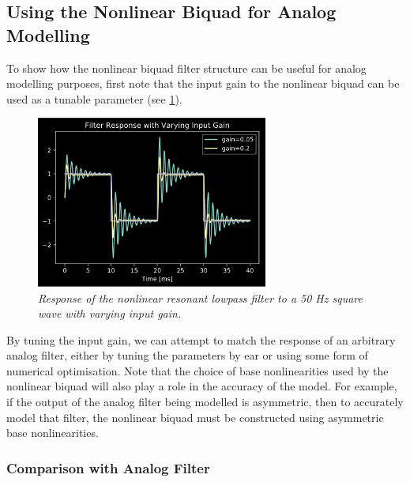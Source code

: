 \documentclass{IEEEtran}
\begin{document}
\subsection{Using the Nonlinear Biquad for Analog Modelling}
%
To show how the nonlinear biquad filter structure can be useful
for analog modelling purposes, first note that the input gain to
the nonlinear biquad can be used as a tunable parameter (see \cref{50hz}).
\newline\newline
%
\begin{figure}[h]
    \center
    \includegraphics[width=3in]{../Pics/50-Hz_Response.png}
    \caption{\label{50hz}{\it Response of the nonlinear resonant lowpass
                            filter to a 50 Hz square wave with varying input gain.}}
\end{figure}
%
By tuning the input gain, we can attempt to match the response of an
arbitrary analog filter, either by tuning the parameters by ear
or using some form of numerical optimisation. Note that the choice
of base nonlinearities used by the nonlinear biquad will also play a
role in the accuracy of the model. For example, if the output of the
analog filter being modelled is asymmetric, then to accurately model
that filter, the nonlinear biquad must be constructed using
asymmetric base nonlinearities.
%

\subsubsection{Comparison with Analog Filter}
\end{document}
